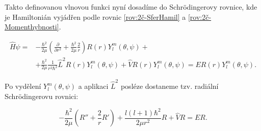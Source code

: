 Takto definovanou vlnovou funkci nyní dosadíme do Schr\"odingerovy rovnice, kde je Hamiltonián vyjádřen podle rovnic \ref{rov:2č-SferHamil} a \ref{rov:2č-Momenthybnosti}.

\begin{equation}
\begin{split}
\hat{H}\psi= & -\frac{\hbar^2}{2\mu}\left(\frac{\partial}{\partial r^2} +\frac{\hbar^2}{2\mu}\frac{2}{r}\right)R(r)Y^m_l(\theta,\psi) + \\
& +\frac{\hbar^2}{2\mu}\frac{1}{r^2\hbar^2}\hat{L}^2R(r)Y^m_l(\theta,\psi)+\hat{V}R(r)Y^m_l(\theta,\psi)=ER(r)Y^m_l(\theta,\psi).
\end{split}
\end{equation}

Po vydělení $ Y^m_l(\theta,\psi) $ a aplikaci $ \hat{L}^2 $ posléze dostaneme tzv. radiální Schr\"odingerovu rovnici:

\begin{equation}
-\frac{\hbar^2}{2\mu}\left(R''+\frac{2}{r}R'\right)+\frac{l\left(l+1\right)\hbar^2}{2\mu r^2}R+\hat{V}R=ER.
\end{equation}













